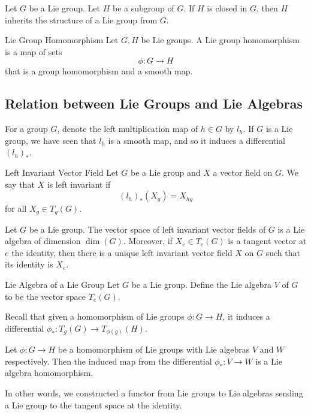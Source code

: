 \documentclass[a4paper]{article}
\begin{document}
\begin{prp}{}{} Let $G$ be a Lie group. Let $H$ be a subgroup of $G$. If $H$ is closed in $G$, then $H$ inherits the structure of a Lie group from $G$. 
\end{prp}

\begin{defn}{Lie Group Homomorphism}{} Let $G,H$ be Lie groups. A Lie group homomorphism is a map of sets $$\phi:G\to H$$ that is a group homomorphism and a smooth map. 
\end{defn}

\subsection{Relation between Lie Groups and Lie Algebras}
For a group $G$, denote the left multiplication map of $h\in G$ by $l_h$. If $G$ is a Lie group, we have seen that $l_h$ is a smooth map, and so it induces a differential $(l_h)_\ast$. 

\begin{defn}{Left Invariant Vector Field}{} Let $G$ be a Lie group and $X$ a vector field on $G$. We say that $X$ is left invariant if $$(l_h)_\ast(X_g)=X_{hg}$$ for all $X_g\in T_g(G)$. 
\end{defn}

\begin{prp}{}{} Let $G$ be a Lie group. The vector space of left invariant vector fields of $G$ is a Lie algebra of dimension $\dim(G)$. Moreover, if $X_e\in T_e(G)$ is a tangent vector at $e$ the identity, then there is a unique left invariant vector field $X$ on $G$ such that its identity is $X_e$. 
\end{prp}

\begin{defn}{Lie Algebra of a Lie Group}{} Let $G$ be a Lie group. Define the Lie algebra $V$ of $G$ to be the vector space $T_e(G)$. 
\end{defn}

Recall that given a homomorphism of Lie groups $\phi:G\to H$, it induces a differential $\phi_\ast:T_g(G)\to T_{\phi(g)}(H)$. 

\begin{prp}{}{} Let $\phi:G\to H$ be a homomorphism of Lie groups with Lie algebras $V$ and $W$ respectively. Then the induced map from the differential $\phi_\ast:V\to W$ is a Lie algebra homomorphism. 
\end{prp}

In other words, we constructed a functor from Lie groups to Lie algebras sending a Lie group to the tangent space at the identity. 
\end{document}
